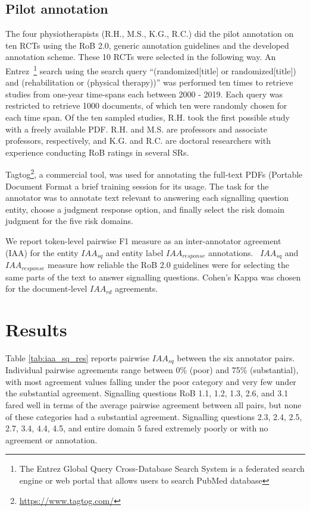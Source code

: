 \documentclass{IOS-Book-Article}
\begin{document}
\subsection{Pilot annotation}
\label{subsec:annotation}
%
The four physiotherapists (R.H., M.S., K.G., R.C.) did the pilot annotation on ten RCTs using the RoB 2.0, generic annotation guidelines and the developed annotation scheme.
These 10 RCTs were selected in the following way.
An Entrez~\footnote{The Entrez Global Query Cross-Database Search System is a federated search engine or web portal that allows users to search PubMed database} search using the search query ``{\selectfont (randomized[title] or randomized[title]) and (rehabilitation or (physical therapy))}'' was performed ten times to retrieve studies from one-year time-spans each between 2000 - 2019.
Each query was restricted to retrieve 1000 documents, of which ten were randomly chosen for each time span.
Of the ten sampled studies, R.H. took the first possible study with a freely available PDF.
R.H. and M.S. are professors and associate professors, respectively, and K.G. and R.C. are doctoral researchers with experience conducting RoB ratings in several SRs.


Tagtog\footnote{\url{https://www.tagtog.com/}}, a commercial tool, was used for annotating the full-text PDFs (Portable Document Format a brief training session for its usage.
The task for the annotator was to annotate text relevant to answering each signalling question entity, choose a judgment response option, and finally select the risk domain judgment for the five risk domains.

We report token-level pairwise F1 measure as an inter-annotator agreement (IAA) for the entity $IAA_{sq}$ and entity label $IAA_{response}$
annotations.~\cite{brandsen2020creating,deleger2012building}
$IAA_{sq}$ and $IAA_{response}$ measure how reliable the RoB 2.0 guidelines were for selecting the same parts of the text to answer signalling questions.
Cohen's Kappa was chosen for the document-level $IAA_{rd}$ agreements.~\cite{mchugh2012interrater}
%
%
%
\section{Results}
\label{sec:results}
%
Table \ref{tab:iaa_sq_res} reports pairwise $IAA_{sq}$ between the six annotator pairs.
Individual pairwise agreements range between 0\% (poor) and 75\% (substantial), with most agreement values falling under the poor category and very few under the substantial agreement.
Signalling questions RoB 1.1, 1.2, 1.3, 2.6, and 3.1 fared well in terms of the average pairwise agreement between all pairs, but none of these categories had a substantial agreement.
Signalling questions 2.3, 2.4, 2.5, 2.7, 3.4, 4.4, 4.5, and entire domain 5 fared extremely poorly or with no agreement or annotation.
\end{document}
